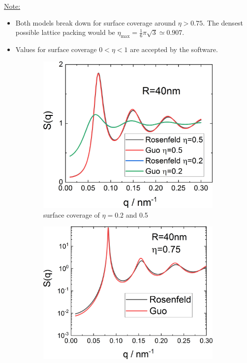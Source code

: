\noindent\underline{Note:}
\begin{itemize}
\item Both models break down for surface coverage around $\eta>0.75$. The densest possible lattice packing would be $\eta_\mathrm{max}=\frac16\pi\sqrt{3}\simeq 0.907$.
\item Values for surface coverage $0 < \eta < 1$ are accepted by the software.
\end{itemize}

\begin{figure}[htb]
\begin{subfigure}[b]{.43\textwidth}
   \centering
   \includegraphics[width=1\textwidth]{../images/structure_factor/2D_hard_disk_fluid/HardDisks_low.png}
   \caption{surface coverage of $\eta=0.2$ and 0.5}
   \label{fig:RosenfeldGuo1}
\end{subfigure}
\hfill
\begin{subfigure}[b]{.47\textwidth}
   \centering
   \includegraphics[width=1\textwidth]{../images/structure_factor/2D_hard_disk_fluid/HardDisks_high.png}

\end{subfigure}
\end{figure}

